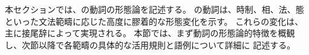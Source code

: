 本セクションでは、\langname の動詞の形態論を記述する。
\langname の動詞は、時制、相、法、態といった文法範疇に応じた高度に膠着的な形態変化を示す。
これらの変化は、主に接尾辞によって実現される。
本節では、まず動詞の形態論的特徴を概観し、次節以降で各範疇の具体的な活用規則と語例について詳細に
記述する。